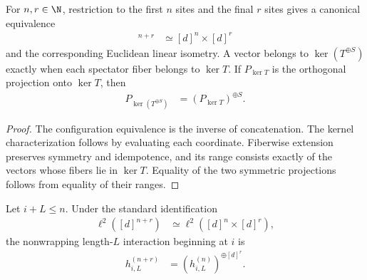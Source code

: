 \begin{lemma}
    \label{lem:right-spectator-kernel-projection}
    \leanok
    For $n,r\in\N$, restriction to the first $n$ sites and the final $r$ sites
    gives a canonical equivalence
    \begin{align}
        [d]^{n+r} & \simeq [d]^n\times[d]^r
    \end{align}
    and the corresponding Euclidean linear isometry.  A vector belongs to
    $\ker(T^{\oplus S})$ exactly when each spectator fiber belongs to $\ker T$.
    If $P_{\ker T}$ is the orthogonal projection onto $\ker T$, then
    \begin{align}
        P_{\ker(T^{\oplus S})} & =(P_{\ker T})^{\oplus S}.
    \end{align}
\end{lemma}

\begin{proof}
    \leanok
    The configuration equivalence is the inverse of concatenation.  The kernel
    characterization follows by evaluating each coordinate.  Fiberwise
    extension preserves symmetry and idempotence, and its range consists
    exactly of the vectors whose fibers lie in $\ker T$.  Equality of the two
    symmetric projections follows from equality of their ranges.
\end{proof}

\begin{lemma}
    \label{thm:local-term-right-spectator-conjugacy}
    \leanok
    Let $i+L\leq n$.  Under the standard identification
    \begin{align}
        \ell^2([d]^{n+r}) & \simeq
        \ell^2([d]^n\times[d]^r),
    \end{align}
    the nonwrapping length-$L$ interaction beginning at $i$ is
    \begin{align}
        h^{(n+r)}_{i,L} & =(h^{(n)}_{i,L})^{\oplus[d]^r}.
    \end{align}
\end{lemma}

